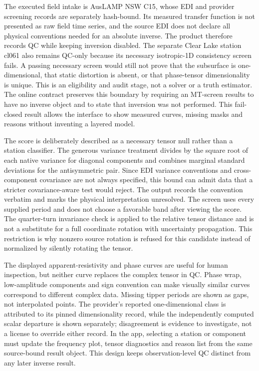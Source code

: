 The executed field intake is AusLAMP NSW C15, whose EDI and provider
screening records are separately hash-bound. Its measured transfer
function is not presented as raw field time series, and the source EDI
does not declare all physical conventions needed for an absolute inverse.
The product therefore records QC while keeping inversion disabled. The
separate Clear Lake station cl061 also remains QC-only because its
necessary isotropic-1D consistency screen fails. A passing necessary
screen would still not prove that the subsurface is one-dimensional,
that static distortion is absent, or that phase-tensor dimensionality is
unique. This is an eligibility and audit stage, not a solver or a truth
estimator. The online contract preserves this boundary by requiring an
MT-screen results to have no inverse object and to state that inversion was not
performed. This fail-closed result allows the interface to show measured
curves, missing masks and reasons without inventing a layered model.

The score is deliberately described as a necessary tensor null rather
than a station classifier. The generous variance treatment divides by
the square root of each native variance for diagonal components and
combines marginal standard deviations for the antisymmetric pair. Since
EDI variance conventions and cross-component covariance are not always
specified, this bound can admit data that a stricter covariance-aware
test would reject. The output records the convention verbatim and marks
the physical interpretation unresolved. The screen uses every supplied
period and does not choose a favorable band after viewing the score.
The quarter-turn invariance check is applied to the relative tensor
distance and is not a substitute for a full coordinate rotation with
uncertainty propagation. This restriction is why nonzero source rotation
is refused for this candidate instead of normalized by silently rotating
the tensor.

The displayed apparent-resistivity and phase curves are useful for human
inspection, but neither curve replaces the complex tensor in QC. Phase
wrap, low-amplitude components and sign convention can make visually
similar curves correspond to different complex data. Missing tipper
periods are shown as gaps, not interpolated points. The provider's
reported one-dimensional class is attributed to its pinned dimensionality
record, while the independently computed scalar departure is shown
separately; disagreement is evidence to investigate, not a license to
override either record. In the app, selecting a station or component
must update the frequency plot, tensor diagnostics and reason list from
the same source-bound result object. This design keeps observation-level QC
distinct from any later inverse result.

